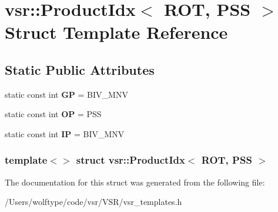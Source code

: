\hypertarget{structvsr_1_1_product_idx_3_01_r_o_t_00_01_p_s_s_01_4}{\section{vsr\-:\-:Product\-Idx$<$ R\-O\-T, P\-S\-S $>$ Struct Template Reference}
\label{structvsr_1_1_product_idx_3_01_r_o_t_00_01_p_s_s_01_4}
}
\subsection*{Static Public Attributes}
\begin{DoxyCompactItemize}
\item 
\hypertarget{structvsr_1_1_product_idx_3_01_r_o_t_00_01_p_s_s_01_4_a13ac670f48180bda44b0bbcf2b7afac0}{static const int {\bfseries G\-P} = B\-I\-V\-\_\-\-M\-N\-V}\label{structvsr_1_1_product_idx_3_01_r_o_t_00_01_p_s_s_01_4_a13ac670f48180bda44b0bbcf2b7afac0}

\item 
\hypertarget{structvsr_1_1_product_idx_3_01_r_o_t_00_01_p_s_s_01_4_af48cc5822f9c9d6bf314798c7cccc167}{static const int {\bfseries O\-P} = P\-S\-S}\label{structvsr_1_1_product_idx_3_01_r_o_t_00_01_p_s_s_01_4_af48cc5822f9c9d6bf314798c7cccc167}

\item 
\hypertarget{structvsr_1_1_product_idx_3_01_r_o_t_00_01_p_s_s_01_4_a67deaa008b720fa84989dd507e956583}{static const int {\bfseries I\-P} = B\-I\-V\-\_\-\-M\-N\-V}\label{structvsr_1_1_product_idx_3_01_r_o_t_00_01_p_s_s_01_4_a67deaa008b720fa84989dd507e956583}

\end{DoxyCompactItemize}
\subsubsection*{template$<$$>$ struct vsr\-::\-Product\-Idx$<$ R\-O\-T, P\-S\-S $>$}



The documentation for this struct was generated from the following file\-:\begin{DoxyCompactItemize}
\item 
/\-Users/wolftype/code/vsr/\-V\-S\-R/vsr\-\_\-templates.\-h\end{DoxyCompactItemize}
